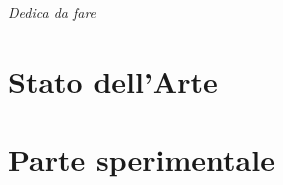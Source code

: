 \documentclass[12pt,a4paper,openright,twoside]{report}
\begin{document}
\begin{titlepage}

\thispagestyle{empty}
\topmargin=6.5cm
\raggedleft
\large

\em
Dedica da fare\\
\newpage

\end{titlepage}



\clearpage{\pagestyle{empty}\cleardoublepage}


\tableofcontents
\rhead[\fancyplain{}{\bfseries\leftmark}]{\fancyplain{}{\bfseries\thepage}}


\clearpage{\pagestyle{empty}\cleardoublepage}
\listoffigures


\clearpage{\pagestyle{empty}\cleardoublepage}
\lhead[\fancyplain{}{\bfseries\thepage}]{\fancyplain{}{\bfseries\rightmark}}

\part{Stato dell'Arte}


\part{Parte sperimentale}




\end{document}
